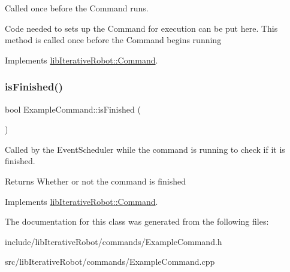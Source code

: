 Called once before the Command runs. 

Code needed to sets up the Command for execution can be put here. This method is called once before the Command begins running 

Implements \mbox{\hyperlink{classlib_iterative_robot_1_1_command_a14543c9d38b07e52f9ffb2af88a63f60}{lib\+Iterative\+Robot\+::\+Command}}.

\mbox{\label{class_example_command_ab4e52d526bda7fe22705b2d3c44286e0}} 
\subsubsection{\texorpdfstring{isFinished()}{isFinished()}}
{\footnotesize\ttfamily bool Example\+Command\+::is\+Finished (\begin{DoxyParamCaption}{ }\end{DoxyParamCaption})\hspace{0.3cm}{\ttfamily [virtual]}}



Called by the Event\+Scheduler while the command is running to check if it is finished. 

\begin{DoxyReturn}{Returns}
Whether or not the command is finished 
\end{DoxyReturn}


Implements \mbox{\hyperlink{classlib_iterative_robot_1_1_command_a8e4dccdd88f432a716090f532ba097f7}{lib\+Iterative\+Robot\+::\+Command}}.



The documentation for this class was generated from the following files\+:\begin{DoxyCompactItemize}
\item 
include/lib\+Iterative\+Robot/commands/Example\+Command.\+h\item 
src/lib\+Iterative\+Robot/commands/Example\+Command.\+cpp\end{DoxyCompactItemize}
